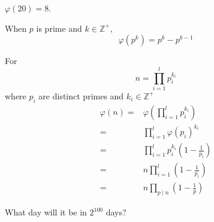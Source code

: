 \begin{exmp}
$\varphi (20) = 8$.
\end{exmp}

\begin{exmp}
When $p$ is prime and $k\in\mathbb{Z}^+$,
\[\varphi (p^k) = p^k - p^{k-1}\]
\end{exmp}

\begin{thm}
For \[n = \prod_{i=1}^l p_i^{k_i}\] where $p_i$ are distinct primes and $k_i\in\mathbb{Z}^+$
\begin{align*}
    \varphi (n) = & \varphi (\prod_{i=1}^l p_i^{k_i}) \\
    = & \prod_{i=1}^l \varphi (p_i)^{k_i} \\
    = & \prod_{i=1}^{l} p_i^{k_i} (1-\frac{1}{p_i}) \\
    = & n \prod_{i=1}^{l} (1-\frac{1}{p_i})\\
    = & n \prod_{p\mid n} (1-\frac{1}{p})
\end{align*}
\end{thm}


\begin{exmp}
What day will it be in $2^{100}$ days?
\end{exmp}